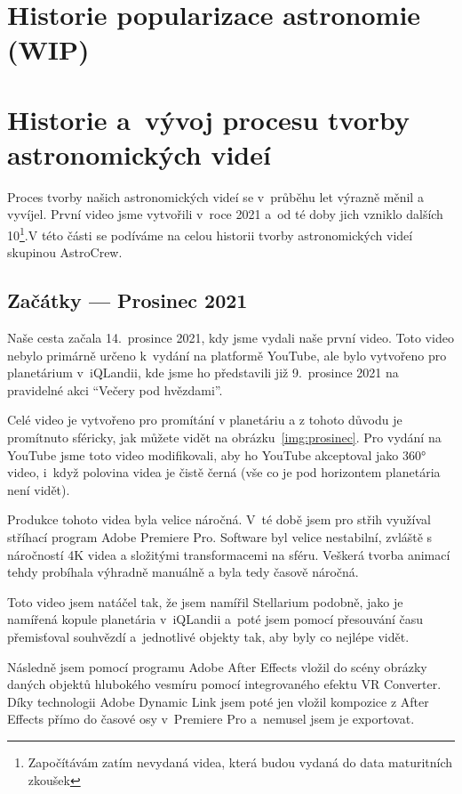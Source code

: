 \documentclass[12pt,a4paper,titlepage]{article}
\begin{document}
\section{Historie popularizace astronomie (WIP)}

\section{Historie a~vývoj procesu tvorby astronomických videí}
Proces tvorby našich astronomických videí se v~průběhu let výrazně měnil a vyvíjel. První video jsme vytvořili v~roce 2021 a~od té doby jich vzniklo dalších 10\footnote{Započítávám zatím nevydaná videa, která budou vydaná do data maturitních zkoušek}.V této části se podíváme na celou historii tvorby astronomických videí skupinou AstroCrew.
\subsection{Začátky --- Prosinec 2021}
Naše cesta začala 14.\ prosince 2021, kdy jsme vydali naše první video. Toto video nebylo primárně určeno k~vydání na platformě YouTube, ale bylo vytvořeno pro planetárium v~iQLandii, kde jsme ho představili již 9.\ prosince 2021 na pravidelné akci \enquote{Večery pod hvězdami}. 

Celé video je vytvořeno pro promítání v planetáriu a z tohoto důvodu je promítnuto sféricky, jak můžete vidět na obrázku~\ref{img:prosinec}. Pro vydání na YouTube jsme toto video modifikovali, aby ho YouTube akceptoval jako 360° video, i~když polovina videa je čistě černá (vše co je pod horizontem planetária není vidět). 

Produkce tohoto videa byla velice náročná. V~té době jsem pro střih využíval stříhací program Adobe Premiere Pro. Software byl velice nestabilní, zvláště s náročností 4K videa a složitými transformacemi na sféru. Veškerá tvorba animací tehdy probíhala výhradně manuálně a byla tedy časově náročná. 

Toto video jsem natáčel tak, že jsem namířil Stellarium podobně, jako je namířená kopule planetária v~iQLandii a~poté jsem pomocí přesouvání času přemisťoval souhvězdí a~jednotlivé objekty tak, aby byly co nejlépe vidět. 

Následně jsem pomocí programu Adobe After Effects vložil do scény obrázky daných objektů hlubokého vesmíru pomocí integrovaného efektu VR Converter. Díky technologii Adobe Dynamic Link jsem poté jen vložil kompozice z After Effects přímo do časové osy v~Premiere Pro a~nemusel jsem je exportovat. 
\end{document}
